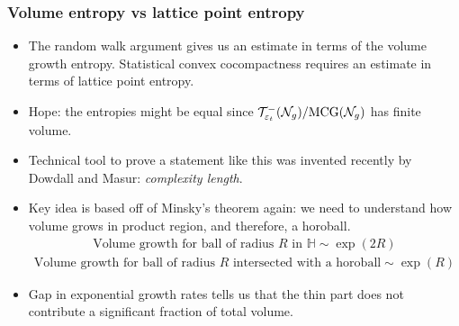 \begin{frame}
  \frametitle{Volume entropy vs lattice point entropy}
  \begin{itemize}
  \item<2-> The random walk argument gives us an estimate in terms of the volume growth entropy. Statistical convex cocompactness requires an estimate in terms of lattice point entropy.
  \item<3-> Hope: the entropies might be equal since $\mathcal{T}_{\varepsilon_t}^{-}(\mathcal{N}_g)/\text{MCG}(\mathcal{N}_g)$ has finite volume.
  \item<4-> Technical tool to prove a statement like this was invented recently by Dowdall and Masur: \emph{complexity length}.
  \item<5-> Key idea is based off of Minsky's theorem again: we need to understand how volume grows in product region, and therefore, a horoball.
     {
      \begin{align*}
        \text{Volume growth for ball of radius $R$ in $\mathbb{H}$} \sim \exp(2R)
      \end{align*}
    }
     {
      \begin{align*}
        \text{Volume growth for ball of radius $R$ intersected with a horoball}  \sim \exp(R)
      \end{align*}
    }
  \item<8-> Gap in exponential growth rates tells us that the thin part does not contribute a significant fraction of total volume.
  \end{itemize}
\end{frame}



